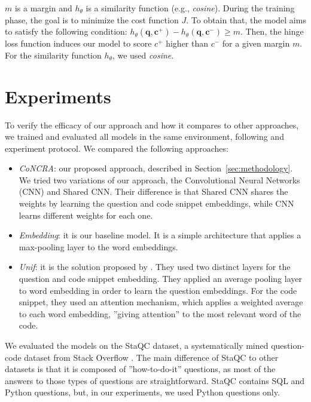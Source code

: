 \documentclass[sigconf]{acmart}
\begin{document}
$m$ is a margin and $h_{\theta}$ is a similarity function (e.g., \textit{cosine}). During the training phase, the goal is to minimize the cost function $J$. To obtain that, the model aims to satisfy the following condition: $h_{\theta}(\bm{q}, \bm{c^{+}}) - h_{\theta}(\bm{q}, \bm{c^{-}}) \geq m$. Then, the hinge loss function induces our model to score $c^{+}$ higher than $c^{-}$ for a given margin $m$. For the similarity function $h_{\theta}$, we used \emph{cosine}. 


\section{Experiments}

To verify the efficacy of our approach and how it compares to other approaches, we trained and evaluated all models in the same environment, following \citet{yao-2018} and \citet{ iyer-etal-2016-summarizing} experiment protocol. We compared the following approaches:

\begin{itemize}
    \item \emph{CoNCRA}: our proposed approach, described in Section~\ref{sec:methodology}. We tried two variations of our approach, the Convolutional Neural Networks (CNN) and Shared CNN. Their difference is that Shared CNN shares the weights by learning the question and code snippet embeddings, while CNN learns different weights for each one.
    \item \emph{Embedding}: it is our baseline model. It is a simple architecture that applies a max-pooling layer to the word embeddings. 
    \item \emph{Unif}: it is the solution proposed by \citet{cambronero-deep-code-search-2019}. They used two distinct layers for the question and code snippet embedding. They applied an average pooling layer to word embedding in order to learn the question embeddings. For the code snippet, they used an attention mechanism, which applies a weighted average to each word embedding, ''giving attention'' to the most relevant word of the code.
\end{itemize}

We evaluated the models on the StaQC dataset, a systematically mined question-code dataset from Stack Overflow \cite{yao-2018}. The main difference of StaQC to other datasets is that it is composed of ''how-to-do-it'' questions, as most of the answers to those types of questions are straightforward. StaQC contains SQL and Python questions, but, in our experiments, we used Python questions only. 
\end{document}
